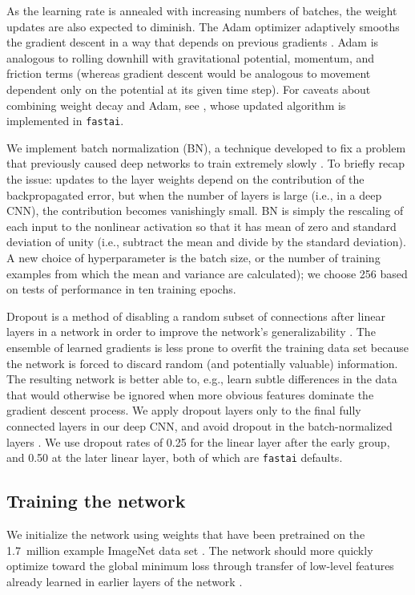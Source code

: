 \documentclass[fleqn,usenatbib]{mnras}
\newcommand{\eg}{e.g.}
\newcommand{\ie}{i.e.}
\begin{document}
As the learning rate is annealed with increasing numbers of batches, the weight updates are also expected to diminish.
The Adam optimizer adaptively smooths the gradient descent in a way that depends on previous gradients \citep{Kingma2014}.
Adam is analogous to rolling downhill with gravitational potential, momentum, and friction terms (whereas gradient descent would be analogous to movement dependent only on the potential at its given time step).
For caveats about combining weight decay and Adam, see \cite{Loshchilov2017}, whose updated algorithm is implemented in \texttt{fastai}.

We implement batch normalization (BN), a technique developed to fix a problem that previously caused deep networks to train extremely slowly \citep{batchnorm}. To briefly recap the issue: updates to the layer weights depend on the contribution of the backpropagated error, but when the number of layers is large (\ie, in a deep CNN), the contribution becomes vanishingly small. BN is simply the rescaling of each input to the nonlinear activation so that it has mean of zero and standard deviation of unity (\ie, subtract the mean and divide by the standard deviation). A new choice of hyperparameter is the batch size, or the number of training examples from which the mean and variance are calculated); we choose 256 based on tests of performance in ten training epochs.

Dropout is a method of disabling a random subset of connections after linear layers in a network in order to improve the network's generalizability \citep{dropout}. The ensemble of learned gradients is less prone to overfit the training data set because the network is forced to discard random (and potentially valuable) information. The resulting network is better able to, \eg, learn subtle differences in the data that would otherwise be ignored when more obvious features dominate the gradient descent process. We apply dropout layers only to the final fully connected layers in our deep CNN, and avoid dropout in the batch-normalized layers \citep[as recommended by][]{batchnorm}. We use dropout rates of 0.25 for the linear layer after the early group, and 0.50 at the later linear layer, both of which are \texttt{fastai} defaults.

\subsection{Training the network}
We initialize the network using weights that have been pretrained on the 1.7~million example ImageNet data set \citep[which contains 1000 classes of objects;][]{ImageNet}. The network should more quickly optimize toward the global minimum loss through transfer of low-level features already learned in earlier layers of the network \citep[known as transfer learning; see, \eg,][]{Pan2010}.
\end{document}
